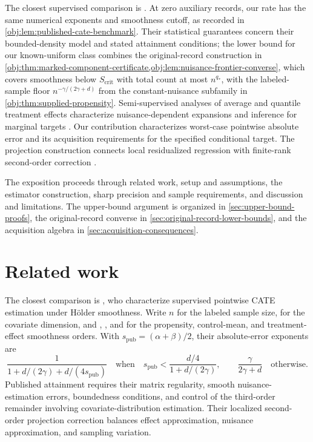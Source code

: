 \documentclass[11pt]{article}
\begin{document}
The closest supervised comparison is \citet[Section 3, Theorems 1--2 and equation (14)]{KennedyBalakrishnanRobinsWasserman2024}. At zero auxiliary records, our rate has the same numerical exponents and smoothness cutoff, as recorded in \cref{obj:lem:published-cate-benchmark}. Their statistical guarantees concern their bounded-density model and stated attainment conditions; the lower bound for our known-uniform class combines the original-record construction in \cref{obj:thm:marked-component-certificate,obj:lem:nuisance-frontier-converse}, which covers smoothness below \(S_{\mathrm{crit}}\) with total count at most \(n^{q_*}\), with the labeled-sample floor \(n^{-\gamma/(2\gamma+d)}\) from the constant-nuisance subfamily in \cref{obj:thm:supplied-propensity}. Semi-supervised analyses of average and quantile treatment effects characterize nuisance-dependent expansions and inference for marginal targets \citep[Theorem 2.1, Corollary 2.1, Theorem 3.1, and Corollary 3.1]{ChakraborttyDai2022}. Our contribution characterizes worst-case pointwise absolute error and its acquisition requirements for the specified conditional target. The projection construction connects local residualized regression \citep[Theorem 3]{Kennedy2023} with finite-rank second-order correction \citep[Lemma 3]{Robins2009}.



The exposition proceeds through related work, setup and assumptions, the estimator construction, sharp precision and sample requirements, and discussion and limitations. The upper-bound argument is organized in \cref{sec:upper-bound-proofs}, the original-record converse in \cref{sec:original-record-lower-bounds}, and the acquisition algebra in \cref{sec:acquisition-consequences}.


\section{Related work}\label{sec:related-work}

The closest comparison is \citet[Section 3, Theorems 1--2 and equation (14)]{KennedyBalakrishnanRobinsWasserman2024}, who characterize supervised pointwise CATE estimation under H\"older smoothness. Write \(n\) for the labeled sample size,  for the covariate dimension, and , , and  for the propensity, control-mean, and treatment-effect smoothness orders. With \(s_{\mathrm{pub}}=(\alpha+\beta)/2\), their absolute-error exponents are
\[
\frac{1}{1+d/(2\gamma)+d/(4s_{\mathrm{pub}})}
\quad\text{when}\quad
s_{\mathrm{pub}}<\frac{d/4}{1+d/(2\gamma)},
\qquad
\frac{\gamma}{2\gamma+d}
\quad\text{otherwise}.
\]
Published attainment requires their matrix regularity, smooth nuisance-estimation errors, boundedness conditions, and control of the third-order remainder involving covariate-distribution estimation. Their localized second-order projection correction balances effect approximation, nuisance approximation, and sampling variation.
\end{document}
